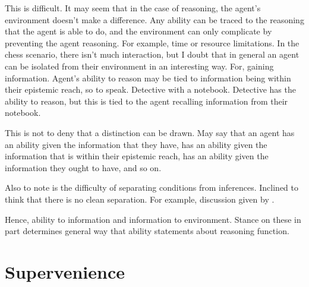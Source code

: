 \documentclass[10pt]{article}
\newcommand{\hozlinedash}[0]{%
  \noindent\hdashrule[0.5ex][c]{\textwidth}{.1pt}{2.5pt}
}
\begin{document}
\begin{note}
  This is difficult.
  It may seem that in the case of reasoning, the agent's environment doesn't make a difference.
  Any ability can be traced to the reasoning that the agent is able to do, and the environment can only complicate by preventing the agent reasoning.
  For example, time or resource limitations.
  In the chess scenario, there isn't much interaction, but I doubt that in general an agent can be isolated from their environment in an interesting way.
  For, gaining information.
  Agent's ability to reason may be tied to information being within their epistemic reach, so to speak.
  Detective with a notebook.
  Detective has the ability to reason, but this is tied to the agent recalling information from their notebook.

  This is not to deny that a distinction can be drawn.
  May say that an agent has an ability given the information that they have, has an ability given the information that is within their epistemic reach, has an ability given the information they ought to have, and so on.

  {
    \color{red}
    Also to note is the difficulty of separating conditions from inferences.
    Inclined to think that there is no clean separation.
    For example, discussion given by \textcite{Simchen:2001aa}.

    Hence, ability to information and information to environment.
    Stance on these in part determines general way that ability statements about reasoning function.
  }
\end{note}


\hozlinedash


\newpage

\section{Supervenience}
\label{sec:supervenience-1}
\end{document}
